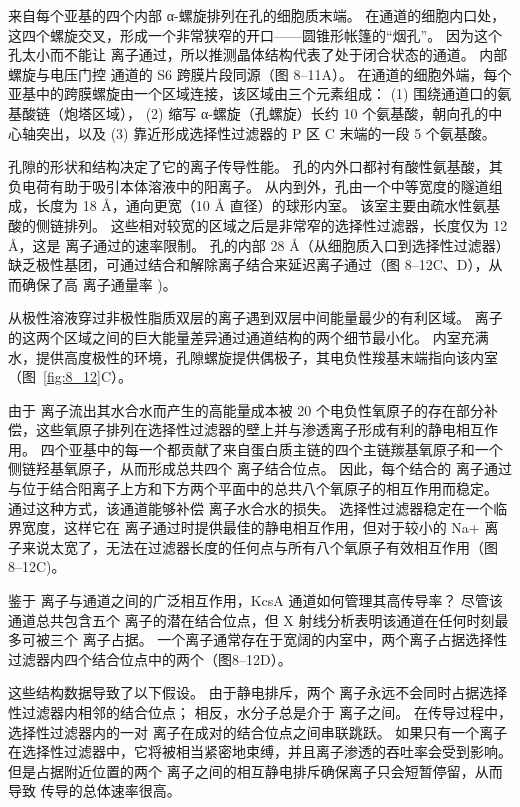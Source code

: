 来自每个亚基的四个内部 α-螺旋排列在孔的细胞质末端。
在通道的细胞内口处，这四个螺旋交叉，形成一个非常狭窄的开口——圆锥形帐篷的“烟孔”。
因为这个孔太小而不能让  离子通过，所以推测晶体结构代表了处于闭合状态的通道。
内部螺旋与电压门控  通道的 S6 跨膜片段同源（图 8–11A）。
在通道的细胞外端，每个亚基中的跨膜螺旋由一个区域连接，该区域由三个元素组成：
(1) 围绕通道口的氨基酸链（炮塔区域），
(2) 缩写 α-螺旋（孔螺旋）长约 10 个氨基酸，朝向孔的中心轴突出，以及
(3) 靠近形成选择性过滤器的 P 区 C 末端的一段 5 个氨基酸。


孔隙的形状和结构决定了它的离子传导性能。
孔的内外口都衬有酸性氨基酸，其负电荷有助于吸引本体溶液中的阳离子。
从内到外，孔由一个中等宽度的隧道组成，长度为 18 Å，通向更宽（10 Å 直径）的球形内室。
该室主要由疏水性氨基酸的侧链排列。
这些相对较宽的区域之后是非常窄的选择性过滤器，长度仅为 12 Å，这是  离子通过的速率限制。
孔的内部 28 Å（从细胞质入口到选择性过滤器）缺乏极性基团，可通过结合和解除离子结合来延迟离子通过（图 8–12C、D），从而确保了高  离子通量率 )。


从极性溶液穿过非极性脂质双层的离子遇到双层中间能量最少的有利区域。
 离子的这两个区域之间的巨大能量差异通过通道结构的两个细节最小化。
内室充满水，提供高度极性的环境，孔隙螺旋提供偶极子，其电负性羧基末端指向该内室（图~\ref{fig:8_12}C）。


由于  离子流出其水合水而产生的高能量成本被 20 个电负性氧原子的存在部分补偿，这些氧原子排列在选择性过滤器的壁上并与渗透离子形成有利的静电相互作用。 
四个亚基中的每一个都贡献了来自蛋白质主链的四个主链羰基氧原子和一个侧链羟基氧原子，从而形成总共四个  离子结合位点。
因此，每个结合的  离子通过与位于结合阳离子上方和下方两个平面中的总共八个氧原子的相互作用而稳定。 
通过这种方式，该通道能够补偿  离子水合水的损失。
选择性过滤器稳定在一个临界宽度，这样它在  离子通过时提供最佳的静电相互作用，但对于较小的 Na+ 离子来说太宽了，无法在过滤器长度的任何点与所有八个氧原子有效相互作用（图 8–12C)。


鉴于  离子与通道之间的广泛相互作用，KcsA 通道如何管理其高传导率？
尽管该通道总共包含五个  离子的潜在结合位点，但 X 射线分析表明该通道在任何时刻最多可被三个  离子占据。
一个离子通常存在于宽阔的内室中，两个离子占据选择性过滤器内四个结合位点中的两个（图8–12D）。


这些结构数据导致了以下假设。
由于静电排斥，两个  离子永远不会同时占据选择性过滤器内相邻的结合位点；
相反，水分子总是介于  离子之间。
在传导过程中，选择性过滤器内的一对  离子在成对的结合位点之间串联跳跃。
如果只有一个离子在选择性过滤器中，它将被相当紧密地束缚，并且离子渗透的吞吐率会受到影响。
但是占据附近位置的两个  离子之间的相互静电排斥确保离子只会短暂停留，从而导致  传导的总体速率很高。


